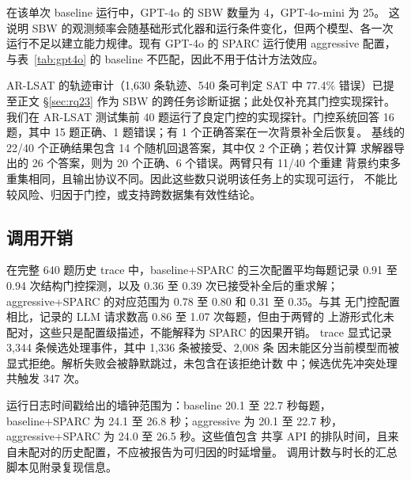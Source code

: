 \documentclass[letterpaper]{article}
\newcommand{\method}{SPARC}
\newcommand{\sbw}{SBW}
\begin{document}
在该单次 baseline 运行中，GPT-4o 的 \sbw{} 数量为 4，GPT-4o-mini 为 25。
这说明 \sbw{} 的观测频率会随基础形式化器和运行条件变化，但两个模型、各一次
运行不足以建立能力规律。现有 GPT-4o 的 \method{} 运行使用 aggressive 配置，
与表~\ref{tab:gpt4o} 的 baseline 不匹配，因此不用于估计方法效应。

AR-LSAT 的轨迹审计（1{,}630 条轨迹、540 条可判定 SAT 中 77.4\% 错误）已提至正文
\S\ref{sec:rq23} 作为 SBW 的跨任务诊断证据；此处仅补充其门控实现探针。我们在
AR-LSAT 测试集前 40 题运行了良定门控的实现探针。门控系统回答
16 题，其中 15 题正确、1 题错误；有 1 个正确答案在一次背景补全后恢复。
基线的 22/40 个正确结果包含 14 个随机回退答案，其中仅 2 个正确；若仅计算
求解器导出的 26 个答案，则为 20 个正确、6 个错误。两臂只有 11/40 个重建
背景约束多重集相同，且输出协议不同。因此这些数只说明该任务上的实现可运行，
不能比较风险、归因于门控，或支持跨数据集有效性结论。

\subsection{调用开销}
\label{sec:efficiency}

在完整 640 题历史 trace 中，baseline+\method{} 的三次配置平均每题记录
0.91 至 0.94 次结构门控探测，以及 0.36 至 0.39 次已接受补全后的重求解；
aggressive+\method{} 的对应范围为 0.78 至 0.80 和 0.31 至 0.35。与其
无门控配置相比，记录的 LLM 请求数高 0.86 至 1.07 次每题，但由于两臂的
上游形式化未配对，这些只是配置级描述，不能解释为 \method{} 的因果开销。
trace 显式记录 3{,}344 条候选处理事件，其中 1{,}336 条被接受、2{,}008 条
因未能区分当前模型而被显式拒绝。解析失败会被静默跳过，未包含在该拒绝计数
中；候选优先冲突处理共触发 347 次。

运行日志时间戳给出的墙钟范围为：baseline 20.1 至 22.7 秒每题，
baseline+\allowbreak\method{} 为 24.1 至 26.8 秒；aggressive 为 20.1 至
22.7 秒，aggressive+\allowbreak\method{} 为 24.0 至 26.5 秒。这些值包含
共享 API 的排队时间，且来自未配对的历史配置，不应被报告为可归因的时延增量。
调用计数与时长的汇总脚本见附录复现信息。

\fi
\end{document}
